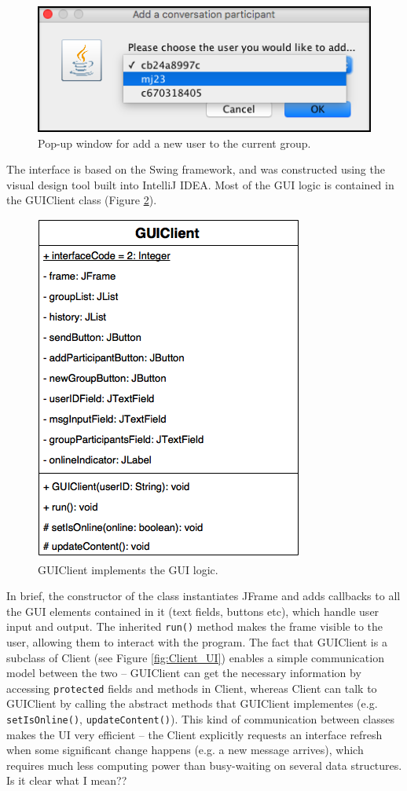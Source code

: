 \documentclass[a4paper, 12pt]{report}
\begin{document}
\begin{figure}[H]
    \captionsetup{width=0.84\textwidth}
    \centering
    \includegraphics[width=0.5\linewidth]{pics/GUI_add.png}
    \caption{\label{fig:GUI_add} Pop-up window for add a new user to the current group.}
\end{figure}

The interface is based on the Swing framework, and was constructed using the visual design tool built into IntelliJ IDEA. Most of the GUI logic is contained in the GUIClient class (Figure \ref{fig:GUIClient}).

\begin{figure}[H]
    \captionsetup{width=0.84\textwidth}
    \centering
    \includegraphics[width=0.45\linewidth]{pics/GUIClient.png}
    \caption{\label{fig:GUIClient} GUIClient implements the GUI logic.}
\end{figure}
In brief, the constructor of the class instantiates JFrame and adds callbacks to all the GUI elements contained in  it (text fields, buttons etc), which handle user input and output. The inherited \texttt{run()} method makes the frame visible to the user, allowing them to interact with the program. The fact that GUIClient is a subclass of Client (see Figure \ref{fig:Client_UI}) enables a simple communication model between the two -- GUIClient can get the necessary information by accessing \texttt{protected} fields and methods in Client, whereas Client can talk to GUIClient by calling the abstract methods that GUIClient implementes (e.g. \texttt{setIsOnline()}, \texttt{updateContent()}). This kind of communication between classes makes the UI very efficient -- the Client explicitly requests an interface refresh when some significant change happens (e.g. a new message arrives), which requires much less computing power than busy-waiting on several data structures. {\color{red} Is it clear what I mean??}
\end{document}
